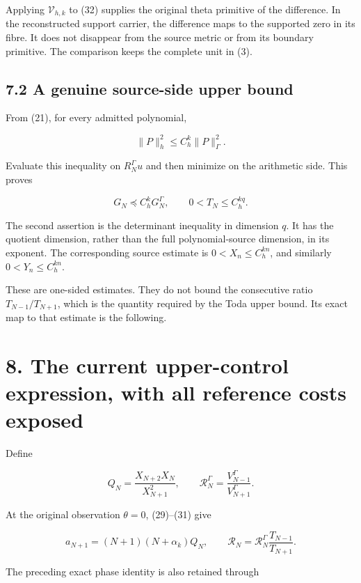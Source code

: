 \documentclass[
  11pt,
]{article}
\begin{document}
Applying \(\mathcal V_{h,k}\) to (32) supplies the original theta
primitive of the difference. In the reconstructed support carrier, the
difference maps to the supported zero in its fibre. It does not
disappear from the source metric or from its boundary primitive. The
comparison keeps the complete unit in (3).

\subsection{7.2 A genuine source-side upper
bound}\label{a-genuine-source-side-upper-bound}

From (21), for every admitted polynomial,

\[
\|P\|_h^2\le C_h^k\|P\|_\Gamma^2.
\]

Evaluate this inequality on \(R_N^\Gamma u\) and then minimize on the
arithmetic side. This proves

\[
\boxed{
G_N\preceq C_h^kG_N^\Gamma,\qquad
0<T_N\le C_h^{kq}.
}                                                                   \tag{33}
\]

The second assertion is the determinant inequality in dimension \(q\).
It has the quotient dimension, rather than the full polynomial-source
dimension, in its exponent. The corresponding source estimate is
\(0<X_n\le C_h^{kn}\), and similarly \(0<Y_n\le C_h^{kn}\).

These are one-sided estimates. They do not bound the consecutive ratio
\(T_{N-1}/T_{N+1}\), which is the quantity required by the Toda upper
bound. Its exact map to that estimate is the following.

\section{8. The current upper-control expression, with all reference
costs
exposed}\label{the-current-upper-control-expression-with-all-reference-costs-exposed}

Define

\[
Q_N=\frac{X_{N+2}X_N}{X_{N+1}^2},\qquad
\mathcal R_N^\Gamma=\frac{V_{N-1}^\Gamma}{V_{N+1}^\Gamma}.
\]

At the original observation \(\theta=0\), (29)--(31) give

\[
\boxed{
a_{N+1}=(N+1)(N+\alpha_k)Q_N,\qquad
\mathcal R_N=\mathcal R_N^\Gamma\frac{T_{N-1}}{T_{N+1}}.
}                                                                   \tag{34}
\]

The preceding exact phase identity is also retained through
\end{document}
